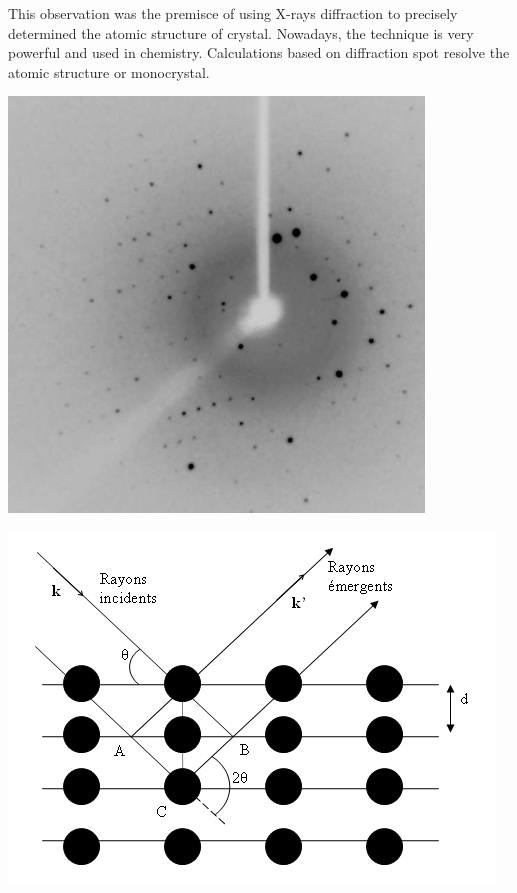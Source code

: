 \documentclass[a4paper,12pt]{report}
\begin{document}
This observation was the premisce of using X-rays diffraction to precisely determined the atomic structure of crystal.
Nowadays, the technique is very powerful and used in chemistry. Calculations based on diffraction spot resolve the atomic structure or monocrystal.

\begin{multicols}{2}
  \begin{center}
    \includegraphics[scale=0.6]{crystal.jpg}
  \end{center}
  \columnbreak
  \begin{center}
    \includegraphics[scale=0.5]{diffraction.jpg}
  \end{center}
\end{multicols}
\end{document}
